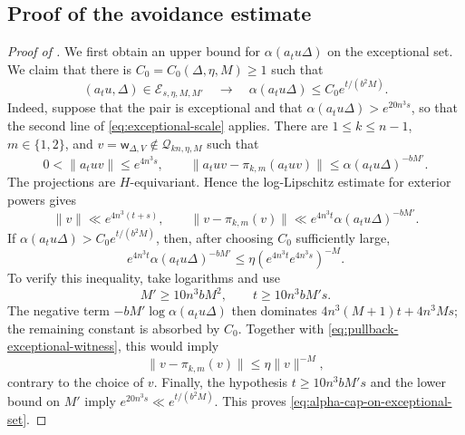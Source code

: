 \documentclass[reqno,11pt]{amsart}
\numberwithin{equation}{section}
\theoremstyle{definition}
\theoremstyle{remark}
\begin{document}
\subsection{Proof of the avoidance estimate}

\begin{proof}[Proof of ]
We first obtain an upper bound for $\alpha(a_tu\Delta)$ on the exceptional set. We claim
that there is $C_0=C_0(\Delta,\eta,M)\ge1$ such that
\begin{equation}\label{eq:alpha-cap-on-exceptional-set}
(a_tu,\Delta)\in
\mathcal E_{s,\eta,M,M'}
\quad\to\quad
\alpha(a_tu\Delta)\le C_0e^{t/(b^2M)}.
\end{equation}
Indeed, suppose that the pair is exceptional and that
$\alpha(a_tu\Delta)>e^{20n^3s}$, so that the second line of
\eqref{eq:exceptional-scale} applies. There are
$1\le k\le n-1$, $m\in\{1,2\}$, and $v=\mathsf w_{\Delta,V}\notin\mathscr Q_{kn,\eta,M}$ such that
$$0<\|a_tuv\|\le e^{4n^3s},\qquad
\|a_tuv-
\pi_{k,m}(a_tuv)\|
\le \alpha(a_tu\Delta)^{-bM'}.
$$
The projections are $H$-equivariant. Hence the log-Lipschitz estimate for
exterior powers gives
\begin{equation}\label{eq:pullback-exceptional-witness}
\|v\|
\ll e^{4n^3(t+s)},
\qquad
\|v-\pi_{k,m}(v)\|
\ll e^{4n^3t}\alpha(a_tu\Delta)^{-bM'}.
\end{equation}
If
$\alpha(a_tu\Delta)>C_0e^{t/(b^2M)}$, then, after choosing $C_0$ sufficiently large,
$$
e^{4n^3t}\alpha(a_tu\Delta)^{-bM'}
\le
\eta
\left(e^{4n^3t}e^{4n^3s}\right)^{-M}.
$$
To verify this inequality, take logarithms and use
$$
M'\ge 10n^3bM^2,
\qquad
t\ge 10n^3bM's.
$$
The negative term
$-bM'\log \alpha(a_tu\Delta)$ then dominates
$4n^3(M+1)t+4n^3Ms$; the remaining
constant is absorbed by $C_0$. Together with
\eqref{eq:pullback-exceptional-witness}, this would imply
$$
\|v-\pi_{k,m}(v)\|
\le\eta\|v\|^{-M},
$$
contrary to the choice of $v$. Finally, the hypothesis
$t\ge 10n^3bM's$ and the lower bound on $M'$ imply
$e^{20n^3s}\ll e^{t/(b^2M)}$. This proves
\eqref{eq:alpha-cap-on-exceptional-set}.


\end{proof}
\end{document}
